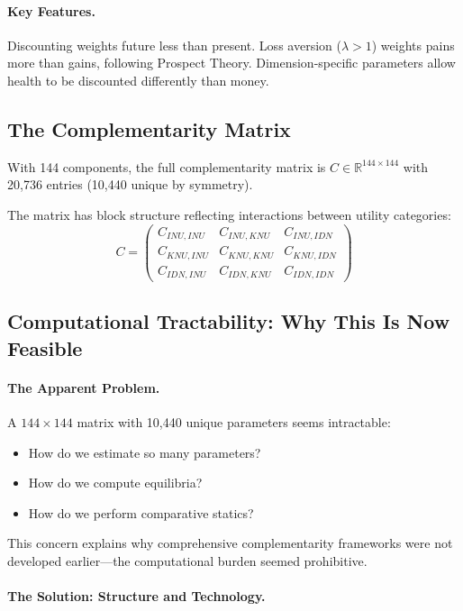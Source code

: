 \paragraph{Key Features.}
Discounting weights future less than present.
Loss aversion ($\lambda > 1$) weights pains more than gains, following Prospect Theory.
Dimension-specific parameters allow health to be discounted differently than money.

\subsection{The Complementarity Matrix}

With 144 components, the full complementarity matrix is $C \in \mathbb{R}^{144 \times 144}$
with 20,736 entries (10,440 unique by symmetry).

The matrix has block structure reflecting interactions between utility categories:
\begin{equation}
  C = \begin{pmatrix}
    C_{INU,INU} & C_{INU,KNU} & C_{INU,IDN} \\
    C_{KNU,INU} & C_{KNU,KNU} & C_{KNU,IDN} \\
    C_{IDN,INU} & C_{IDN,KNU} & C_{IDN,IDN}
  \end{pmatrix}
\end{equation}

\subsection{Computational Tractability: Why This Is Now Feasible}

\paragraph{The Apparent Problem.}
A $144 \times 144$ matrix with 10,440 unique parameters seems intractable:
\begin{itemize}
  \item How do we estimate so many parameters?
  \item How do we compute equilibria?
  \item How do we perform comparative statics?
\end{itemize}

This concern explains why comprehensive complementarity frameworks
were not developed earlier---the computational burden seemed prohibitive.

\paragraph{The Solution: Structure and Technology.}

